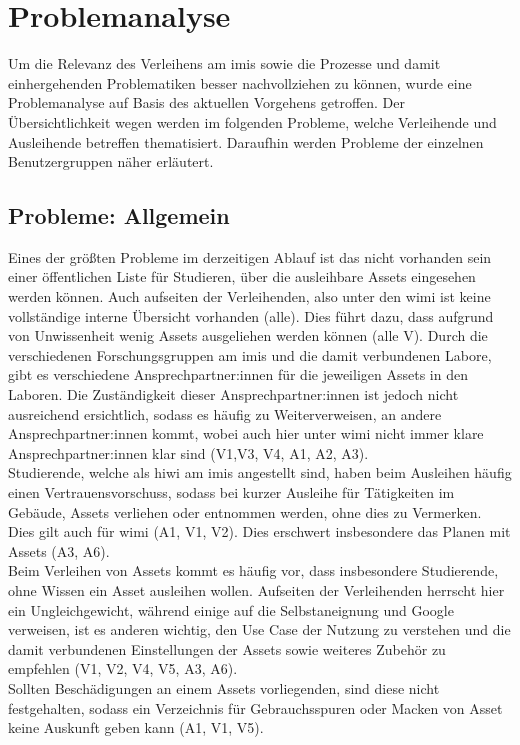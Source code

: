 \section{Problemanalyse}
\label{section:iststand}
        
Um die Relevanz des Verleihens am \ac{imis} sowie die Prozesse und damit einhergehenden
Problematiken besser nachvollziehen zu können, wurde eine Problemanalyse auf Basis des aktuellen
Vorgehens getroffen. Der Übersichtlichkeit wegen werden im folgenden Probleme, welche Verleihende
und Ausleihende betreffen thematisiert. Daraufhin werden Probleme der einzelnen Benutzergruppen
näher erläutert.

\subsection{Probleme: Allgemein}
\label{section:probleme-allgemein}
Eines der größten Probleme im derzeitigen Ablauf ist das nicht vorhanden sein einer öffentlichen
Liste für Studieren, über die ausleihbare Assets eingesehen werden können. Auch aufseiten der
Verleihenden, also unter den \ac{wimi} ist keine vollständige interne Übersicht vorhanden (alle).
Dies führt dazu, dass aufgrund von Unwissenheit wenig Assets ausgeliehen werden können (alle V). Durch
die verschiedenen Forschungsgruppen am \ac{imis} und die damit verbundenen Labore, gibt es
verschiedene Ansprechpartner:innen für die jeweiligen Assets in den Laboren. Die Zuständigkeit
dieser Ansprechpartner:innen ist jedoch nicht ausreichend ersichtlich, sodass es häufig zu
Weiterverweisen, an andere Ansprechpartner:innen kommt, wobei auch hier unter \ac{wimi} nicht immer
klare Ansprechpartner:innen klar sind (V1,V3, V4, A1, A2, A3). \\
Studierende, welche als \ac{hiwi} am \ac{imis} angestellt sind, haben beim Ausleihen häufig einen
Vertrauensvorschuss, sodass bei kurzer Ausleihe für Tätigkeiten im Gebäude, Assets verliehen oder
entnommen werden, ohne dies zu Vermerken. Dies gilt auch für \ac{wimi} (A1, V1, V2). Dies erschwert
insbesondere das Planen mit Assets (A3, A6).\\
Beim Verleihen von Assets kommt es häufig vor, dass insbesondere Studierende, ohne Wissen ein Asset
ausleihen wollen. Aufseiten der Verleihenden herrscht hier ein Ungleichgewicht, während einige auf
die Selbstaneignung und Google verweisen, ist es anderen wichtig, den Use Case der Nutzung zu
verstehen und die damit verbundenen Einstellungen der Assets sowie weiteres Zubehör zu empfehlen
(V1, V2, V4, V5, A3, A6). \\
Sollten Beschädigungen an einem Assets vorliegenden, sind diese nicht festgehalten, sodass ein
Verzeichnis für Gebrauchsspuren oder Macken von Asset keine Auskunft geben kann (A1, V1, V5).

